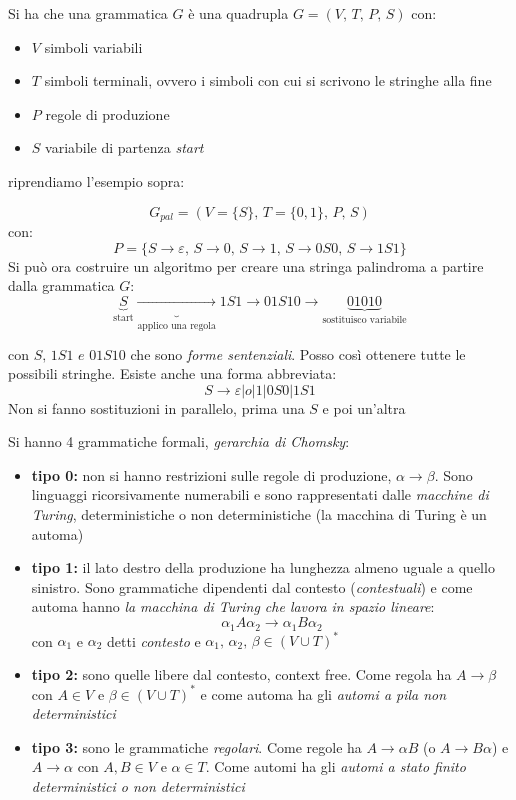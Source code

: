 \documentclass[a4paper,12pt, oneside]{book}
\begin{document}
Si ha che una grammatica $G$ è una quadrupla $G=(V,\,T,\,P,\,S)$ con:
\begin{itemize}
	\item $V$ simboli variabili
	\item $T$ simboli terminali, ovvero i simboli con cui si scrivono le stringhe alla fine
	\item $P$ regole di produzione
	\item $S$ variabile di partenza \textit{start}
\end{itemize}
riprendiamo l'esempio sopra:
\begin{esempio}
	$$G_{pal}=(V=\{S\},\, T=\{0, 1\},\, P,\, S)$$
	con:
	$$P=\{S\to\varepsilon,\, S\to 0,\, S\to 1,\, S\to 0S0,\, S\to 1S1\}$$
	Si può ora costruire un algoritmo per creare una stringa palindroma a partire dalla grammatica $G$:
	$$\underbrace{S}_{\mbox{start}}\underbrace{\to}_{\mbox{applico una regola}} 1S1 \to 01S10\to \underbrace{01010}_{\mbox{sostituisco variabile}}$$

	con $S,\, 1S1\,\, e\,\, 01S10$ che sono \textit{forme sentenziali}. Posso così ottenere tutte le possibili stringhe. Esiste anche una forma abbreviata:
	$$S\to \varepsilon|o|1|0S0|1S1$$
	Non si fanno sostituzioni in parallelo, prima una $S$ e poi un'altra
\end{esempio}
Si hanno 4 grammatiche formali, \textit{gerarchia di Chomsky}:
\begin{itemize}
	\item \textbf{tipo 0:} non si hanno restrizioni sulle regole di produzione, $\alpha\to\beta$. Sono linguaggi ricorsivamente numerabili e sono rappresentati dalle \textit{macchine di Turing}, deterministiche o non deterministiche (la macchina di Turing è un automa)
	\item \textbf{tipo 1:}  il lato destro della produzione ha lunghezza almeno uguale a quello sinistro. Sono grammatiche dipendenti dal contesto (\textit{contestuali}) e come automa hanno\textit{ la macchina di Turing che lavora in spazio lineare}:
	      $$\alpha_1A\alpha_2\to \alpha_1B\alpha_2$$
	      con $\alpha_1$ e $\alpha_2$ detti \textit{contesto} e $\alpha_1,\,\alpha_2,\, \beta\in (V\cup T)^*$
	\item \textbf{tipo 2:} sono quelle libere dal contesto, context free. Come regola ha $A\to\beta$ con $A\in V$ e $\beta\in (V\cup T)^*$ e come automa ha gli \textit{automi a pila non deterministici}
	\item \textbf{tipo 3:} sono le grammatiche \textit{regolari}. Come regole ha $A\to\alpha B$ (o $A\to B\alpha$) e $A\to\alpha$  con $A,B\in V$ e $\alpha\in T$. Come automi ha gli \textit{automi a stato finito deterministici o non deterministici}
\end{itemize}
\end{document}
